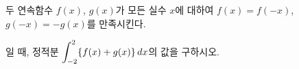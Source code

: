 두 연속함수 $f(x)$, $g(x)$가 모든 실수 $x$에 대하여 $f(x)=f(-x)$, $g(-x)=-g(x)$를 만족시킨다. \par\smallskip{}\par\smallskip\noindent 일 때, 정적분 $\displaystyle\int_{-2}^{2}\{f(x)+g(x)\}\mkern3mu dx$의 값을 구하시오.
